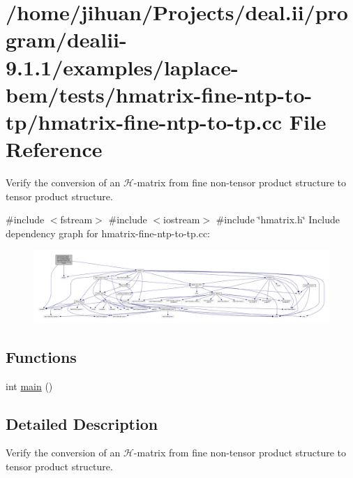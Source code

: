 \hypertarget{hmatrix-fine-ntp-to-tp_8cc}{}\section{/home/jihuan/\+Projects/deal.ii/program/dealii-\/9.1.1/examples/laplace-\/bem/tests/hmatrix-\/fine-\/ntp-\/to-\/tp/hmatrix-\/fine-\/ntp-\/to-\/tp.cc File Reference}
\label{hmatrix-fine-ntp-to-tp_8cc}


Verify the conversion of an $\mathcal{H}$-\/matrix from fine non-\/tensor product structure to tensor product structure.  


{\ttfamily \#include $<$fstream$>$}\newline
{\ttfamily \#include $<$iostream$>$}\newline
{\ttfamily \#include \char`\"{}hmatrix.\+h\char`\"{}}\newline
Include dependency graph for hmatrix-\/fine-\/ntp-\/to-\/tp.cc\+:
\nopagebreak
\begin{figure}[H]
\begin{center}
\leavevmode
\includegraphics[width=350pt]{hmatrix-fine-ntp-to-tp_8cc__incl}
\end{center}
\end{figure}
\subsection*{Functions}
\begin{DoxyCompactItemize}
\item 
int \hyperlink{hmatrix-fine-ntp-to-tp_8cc_ae66f6b31b5ad750f1fe042a706a4e3d4}{main} ()
\end{DoxyCompactItemize}


\subsection{Detailed Description}
Verify the conversion of an $\mathcal{H}$-\/matrix from fine non-\/tensor product structure to tensor product structure. 

